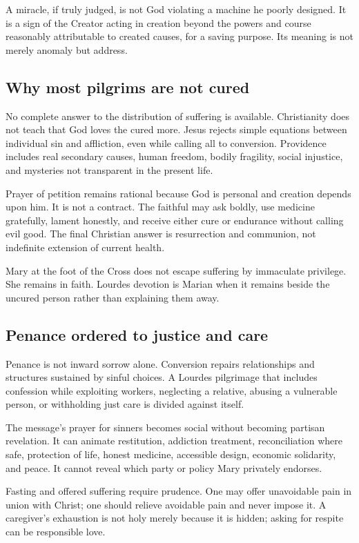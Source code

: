 A miracle, if truly judged, is not God violating a machine he poorly designed. It is a sign of the Creator acting in creation beyond the powers and course reasonably attributable to created causes, for a saving purpose. Its meaning is not merely anomaly but address.

\subsection{Why most pilgrims are not cured}

No complete answer to the distribution of suffering is available. Christianity does not teach that God loves the cured more. Jesus rejects simple equations between individual sin and affliction, even while calling all to conversion. Providence includes real secondary causes, human freedom, bodily fragility, social injustice, and mysteries not transparent in the present life.

Prayer of petition remains rational because God is personal and creation depends upon him. It is not a contract. The faithful may ask boldly, use medicine gratefully, lament honestly, and receive either cure or endurance without calling evil good. The final Christian answer is resurrection and communion, not indefinite extension of current health.

Mary at the foot of the Cross does not escape suffering by immaculate privilege. She remains in faith. Lourdes devotion is Marian when it remains beside the uncured person rather than explaining them away.

\subsection{Penance ordered to justice and care}

Penance is not inward sorrow alone. Conversion repairs relationships and structures sustained by sinful choices. A Lourdes pilgrimage that includes confession while exploiting workers, neglecting a relative, abusing a vulnerable person, or withholding just care is divided against itself.

The message's prayer for sinners becomes social without becoming partisan revelation. It can animate restitution, addiction treatment, reconciliation where safe, protection of life, honest medicine, accessible design, economic solidarity, and peace. It cannot reveal which party or policy Mary privately endorses.

Fasting and offered suffering require prudence. One may offer unavoidable pain in union with Christ; one should relieve avoidable pain and never impose it. A caregiver's exhaustion is not holy merely because it is hidden; asking for respite can be responsible love.

